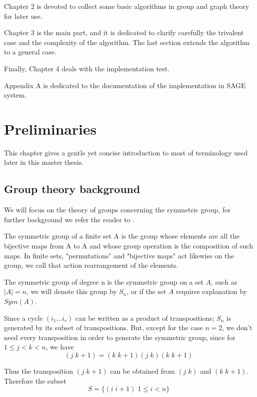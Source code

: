 \documentclass[12pt,a4paper]{book}
\theoremstyle{plain}
\theoremstyle{definition}
\theoremstyle{remark}
\begin{document}
Chapter 2 is devoted to collect  some basic algorithms in group and graph theory for later use.

Chapter 3 is the main part, and it is dedicated to  clarify carefully the trivalent case and the complexity of the 
algorithm.  The last section  extends the algorithm to a general case. 

Finally, Chapter 4 deals with  the implementation test.  

Appendix A is dedicated to the documentation of the implementation in SAGE system.




 
\chapter{Preliminaries}
 
This chapter gives a gentle yet concise introduction to most of terminology used later in this master thesis.

\section{Group theory background} \nocite{rose1978course}

We will focus on the theory of groups concerning the symmetric group, for further background we refer the reader to \cite{rose1978course}.

The symmetric group of a finite set A is the group whose elements are all the bijective maps from A to A and whose group operation is 
the composition of such maps. In finite sets, "permutations" and "bijective maps" act  likewise on the group, we call that action 
rearrangement of the elements. 

The symmetric group of degree n is the symmetric group on a set $A$, such as $|A|=n$, we will denote this group by $S_n$, or if the 
set $A$ requires explanation by $Sym(A)$. 

Since a cycle $ (i_1 \ldots i_r )$ can be written as a product of transpositions; $S_n$ is 
generated by its subset of transpositions. But, except for the case $n=2$, we don't need every transposition in order to generate the 
symmetric group, since for $1 \leq j< k < n$, we have
\[
 (j \; k+1) = (k \; k+1)(j \; k )(k \; k+1)
\]
 
Thus the transposition $(j\; k+1)$ can be obtained from $(j \; k)$ and $(k \; k+1)$. Therefore the subset 
\[
 S = \{ (i \; i+1 ) \; 1 \leq i < n \}
\]
\end{document}
